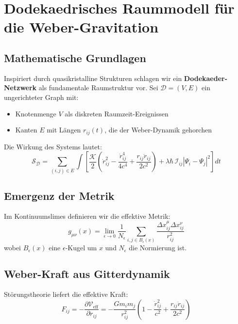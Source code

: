 \newpage
\section{Dodekaedrisches Raummodell für die Weber-Gravitation}
\subsection{Mathematische Grundlagen}
Inspiriert durch quasikristalline Strukturen schlagen wir ein \textbf{Dodekaeder-Netzwerk} als fundamentale Raumstruktur vor. Sei $\mathcal{D} = (V,E)$ ein ungerichteter Graph mit:

\begin{itemize}
\item Knotenmenge $V$ als diskreten Raumzeit-Ereignissen
\item Kanten $E$ mit Längen $r_{ij}(t)$, die der Weber-Dynamik gehorchen
\end{itemize}

Die Wirkung des Systems lautet:
\begin{equation}
\mathcal{S}_{\mathcal{D}} = \sum_{(i,j)\in E} \int \left[ 
\frac{\mathcal{K}}{2} \left( \dot{r}_{ij}^2 - \frac{\dot{r}_{ij}^4}{4c^4} + \frac{r_{ij}\ddot{r}_{ij}}{2c^2} \right) 
+ \lambda \hbar \, \mathcal{I}_{ij} |\Psi_i - \Psi_j|^2 
\right] dt
\end{equation}

\subsection{Emergenz der Metrik}
Im Kontinuumslimes definieren wir die effektive Metrik:
\begin{equation}
g_{\mu\nu}(x) = \lim_{\epsilon \to 0} \frac{1}{N_\epsilon} \sum_{i,j \in B_\epsilon(x)} \frac{\Delta x_{ij}^\mu \Delta x_{ij}^\nu}{r_{ij}^2}
\end{equation}
wobei $B_\epsilon(x)$ eine $\epsilon$-Kugel um $x$ und $N_\epsilon$ die Normierung ist.

\subsection{Weber-Kraft aus Gitterdynamik}
Störungstheorie liefert die effektive Kraft:
\begin{equation}
F_{ij} = -\frac{\partial \mathcal{V}_{\text{eff}}}{\partial r_{ij}} = -\frac{G m_i m_j}{r_{ij}^2} \left(1 - \frac{\dot{r}_{ij}^2}{c^2} + \frac{r_{ij}\ddot{r}_{ij}}{2c^2}\right)
\end{equation}

